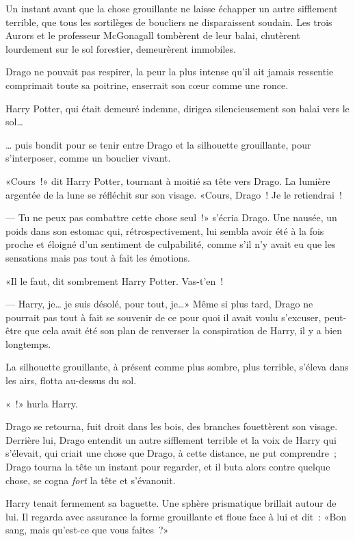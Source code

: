 \begin{em}
Un instant avant que la chose grouillante ne laisse échapper un autre sifflement terrible, que tous les sortilèges de boucliers ne disparaissent soudain. Les trois Aurors et le professeur McGonagall tombèrent de leur balai, chutèrent lourdement sur le sol forestier, demeurèrent immobiles.

Drago ne pouvait pas respirer, la peur la plus intense qu'il ait jamais ressentie comprimait toute sa poitrine, enserrait son cœur comme une ronce.

Harry Potter, qui était demeuré indemne, dirigea silencieusement son balai vers le sol…

… puis bondit pour se tenir entre Drago et la silhouette grouillante, pour s'interposer, comme un bouclier vivant.

«Cours~!» dit Harry Potter, tournant à moitié sa tête vers Drago. La lumière argentée de la lune se réfléchit sur son visage. «Cours, Drago~! Je le retiendrai~!

--- Tu ne peux pas combattre cette chose seul~!» s'écria Drago. Une nausée, un poids dans son estomac qui, rétrospectivement, lui sembla avoir été à la fois proche et éloigné d'un sentiment de culpabilité, comme s'il n'y avait eu que les sensations mais pas tout à fait les émotions.

«Il le faut, dit sombrement Harry Potter. Vas-t'en~!

--- Harry, je… je suis désolé, pour tout, je…» Même si plus tard, Drago ne pourrait pas tout à fait se souvenir de ce pour quoi il avait voulu s'excuser, peut-être que cela avait été son plan de renverser la conspiration de Harry, il y a bien longtemps.

La silhouette grouillante, à présent comme plus sombre, plus terrible, s'éleva dans les airs, flotta au-dessus du sol.

«~!» hurla Harry.

Drago se retourna, fuit droit dans les bois, des branches fouettèrent son visage. Derrière lui, Drago entendit un autre sifflement terrible et la voix de Harry qui s'élevait, qui criait une chose que Drago, à cette distance, ne put comprendre~; Drago tourna la tête un instant pour regarder, et il buta alors contre quelque chose, se cogna \emph{fort} la tête et s'évanouit.
\end{em}

\later

Harry tenait fermement sa baguette. Une sphère prismatique brillait autour de lui. Il regarda avec assurance la forme grouillante et floue face à lui et dit~: «Bon sang, mais qu'est-ce que vous faites~?»


